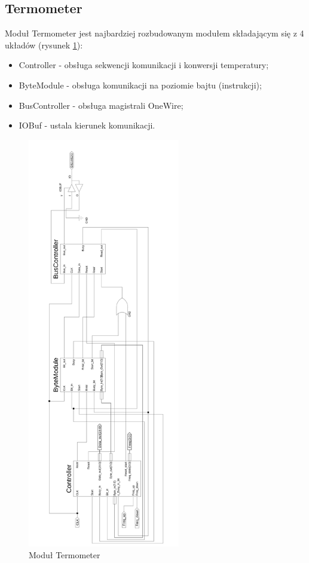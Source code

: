 \documentclass[a4paper]{article}
\begin{document}
\subsection{Termometer}
Moduł Termometer jest najbardziej rozbudowanym modułem składającym się z 4 układów (rysunek \ref{termometer}):
\begin{itemize}
\item Controller - obsługa sekwencji komunikacji i konwersji temperatury;
\item ByteModule - obsługa komunikacji na poziomie bajtu (instrukcji);
\item BusController - obsługa magistrali OneWire;
\item IOBuf - ustala kierunek komunikacji.
\end{itemize}

\begin{figure}[H]
\begin{center}
\includegraphics[height=18cm]{graphics/termometer.png}
\end{center}
\caption{Moduł Termometer}
\label{termometer}
\end{figure}
\end{document}
